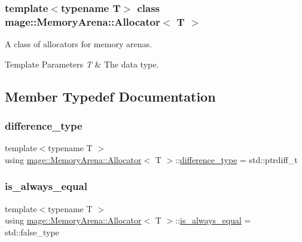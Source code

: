 \subsubsection*{template$<$typename T$>$\newline
class mage\+::\+Memory\+Arena\+::\+Allocator$<$ T $>$}

A class of allocators for memory arenas.


\begin{DoxyTemplParams}{Template Parameters}
{\em T} & The data type. \\
\hline
\end{DoxyTemplParams}


\subsection{Member Typedef Documentation}
\mbox{\label{classmage_1_1_memory_arena_1_1_allocator_a5f2d728dd10f12d727c7572a3a270ee3}} 
\subsubsection{\texorpdfstring{difference\+\_\+type}{difference\_type}}
{\footnotesize\ttfamily template$<$typename T $>$ \\
using \mbox{\hyperlink{classmage_1_1_memory_arena_1_1_allocator}{mage\+::\+Memory\+Arena\+::\+Allocator}}$<$ T $>$\+::\mbox{\hyperlink{classmage_1_1_memory_arena_1_1_allocator_a5f2d728dd10f12d727c7572a3a270ee3}{difference\+\_\+type}} =  std\+::ptrdiff\+\_\+t}

\mbox{\label{classmage_1_1_memory_arena_1_1_allocator_a5f25626106f2f21d37b75b271f230ae4}} 
\subsubsection{\texorpdfstring{is\+\_\+always\+\_\+equal}{is\_always\_equal}}
{\footnotesize\ttfamily template$<$typename T $>$ \\
using \mbox{\hyperlink{classmage_1_1_memory_arena_1_1_allocator}{mage\+::\+Memory\+Arena\+::\+Allocator}}$<$ T $>$\+::\mbox{\hyperlink{classmage_1_1_memory_arena_1_1_allocator_a5f25626106f2f21d37b75b271f230ae4}{is\+\_\+always\+\_\+equal}} =  std\+::false\+\_\+type}

